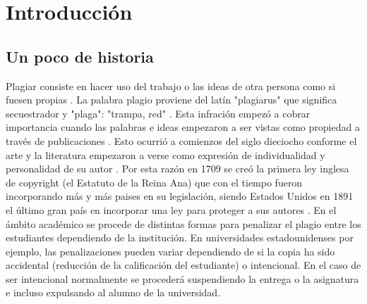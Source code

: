 \chapter{Introducción}
 


\section{Un poco de historia}

Plagiar consiste en hacer uso del trabajo o las ideas de otra persona como si fuesen propias \cite{plagio_rae}.
\newline
La palabra plagio proviene del latín "plagiarus" que significa secuestrador y "plaga": "trampa, red" \cite{plagio_etim}. 
\newline
Esta infración empezó a cobrar importancia cuando las palabras e ideas empezaron a ser vistas como propiedad a través de publicaciones . Esto ocurrió a comienzos del siglo dieciocho conforme el arte y la literatura empezaron a verse como expresión de individualidad y personalidad de su autor \cite{plagio_paper}.
\newline
Por esta razón en 1709 se creó la primera ley inglesa de copyright (el Estatuto de la Reina Ana) que con el tiempo fueron incorporando más y más paises en su legislación, siendo Estados Unidos en 1891 el último gran país en incorporar una ley para proteger a sus autores \cite{plagio_historia}.
\newline
En el ámbito académico se procede de distintas formas para penalizar el plagio entre los estudiantes dependiendo de la institución.
\newline
En universidades estadounidenses por ejemplo, las penalizaciones pueden variar dependiendo de si la copia ha sido accidental (reducción de la calificación del estudiante) o intencional. En el caso de ser intencional normalmente se procederá suspendiendo la entrega o la asignatura e incluso expulsando al alumno de la universidad. 
\newline

